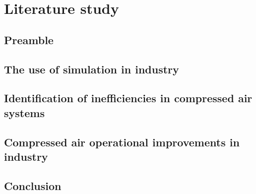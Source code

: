 \chapter{Literature study}
\section{Preamble}
\section{The use of simulation in industry}
\section{Identification of inefficiencies in compressed air systems}
\section{Compressed air operational improvements in industry}
\section{Conclusion}